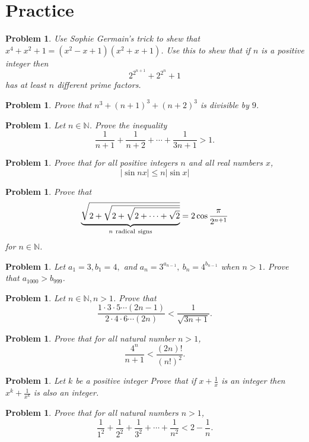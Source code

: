 \documentclass[11pt, openany]{book}
\theoremstyle{change} \theoremheaderfont{\blue\sffamily\bfseries}
\newtheorem{pro}[thm]{Problem}
\theoremstyle{nonumberplain} \theoremheaderfont{\sffamily\bfseries}
\newcommand{\BBN}{\mathbb{N}}
\newcommand{\dis}{\displaystyle}
\newcommand{\í}{\'{\i}}
\begin{document}
\clearpage

\section*{Practice}\begin{multicols}{2}\columnseprule 1pt \columnsep 25pt
\begin{pro}
Use Sophie Germain's trick to shew that $x^4 + x^2 + 1 = (x^2 - x
+ 1)(x^2 + x + 1)$. Use this to shew that if $n$ is a positive
integer then
$$2^{2^{n + 1}} + 2^{2^n} + 1$$has at least $n$ different prime factors.
\end{pro}
\begin{pro}
Prove that $n^3 + (n + 1)^3 + (n + 2)^3$ is divisible by $9$.
\end{pro}
\begin{pro}
Let $n \in \BBN$. Prove the inequality
$$\frac{1}{n + 1} + \frac{1}{n + 2} + \cdots + \frac{1}{3n + 1} > 1.$$
\end{pro}
\begin{pro}
Prove that for all positive integers $n$ and all real numbers $x$,
\begin{equation}
|\sin n x| \leq n |\sin x|
\end{equation}
\end{pro}
\begin{pro}
Prove that
$$\underbrace{\sqrt{2 + \sqrt{2 + \sqrt{2 + \cdots + \sqrt{2}}}}}_{n \
{\rm radical\ signs}} = 2\cos \frac{\pi}{2^{n + 1}}$$for $n \in
\BBN$.
\end{pro}

\begin{pro}
Let $a_1 = 3, b_1 = 4,$ and $a_n = 3^{a_{n - 1}}, \ b_n = 4^{b_{n
- 1}}$ when $n > 1$. Prove that $a_{1000} > b_{999}$.
\end{pro}
\begin{pro}
Let $n\in \BBN , n > 1$. Prove that
$$\frac{1\cdot 3\cdot 5\cdots (2n - 1)}{2\cdot 4\cdot 6\cdots (2n)} < \frac{1}{\sqrt{3n + 1}}.$$
\end{pro}
\begin{pro}
Prove that for all natural number $n > 1$,
$$\frac{4^n}{n + 1} < \frac{(2n)!}{(n!)^2}.$$
\end{pro}
\begin{pro} Let $k$ be a positive integer
Prove that if $\dis{x + \frac{1}{x}}$ is an integer then $\dis{x^k
+ \frac{1}{x^k}}$ is also an integer.
\end{pro}
\begin{pro}
Prove that for all natural numbers $n > 1$,
$$\frac{1}{1^2} + \frac{1}{2^2} + \frac{1}{3^2} + \cdots + \frac{1}{n^2} < 2 - \frac{1}{n}.$$
\end{pro}


\end{multicols}
\end{document}
